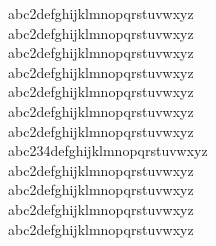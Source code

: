 \documentclass{article}
\begin{document}

%


abc2defghijklmnopqrstuvwxyz\\
abc{2}defghijklmnopqrstuvwxyz\\
abc2defghijklmnopqrstuvwxyz\\

abc2defghijklmnopqrstuvwxyz\\
abc{2}defghijklmnopqrstuvwxyz\\
abc2defghijklmnopqrstuvwxyz\\

abc2defghijklmnopqrstuvwxyz\\
abc{234}defghijklmnopqrstuvwxyz\\
abc2defghijklmnopqrstuvwxyz\\

abc2defghijklmnopqrstuvwxyz\\
abc{2}defghijklmnopqrstuvwxyz\\
abc2defghijklmnopqrstuvwxyz\\


%
\end{document}
